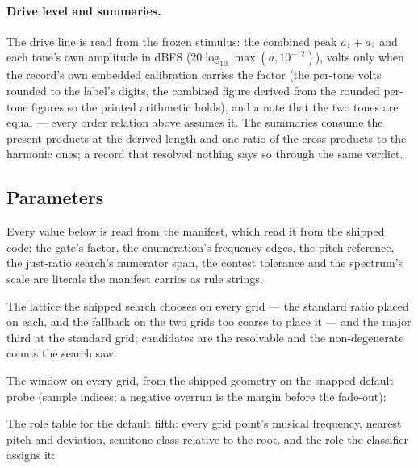 \documentclass[11pt,a4paper]{article}
\begin{document}
\paragraph{Drive level and summaries.}
The drive line is read from the frozen stimulus: the combined peak
$a_1 + a_2$ and each tone's own amplitude in dBFS
($20\log_{10}\max(a, 10^{-12})$), volts only when the record's own
embedded calibration carries the factor (the per-tone volts rounded to the
label's digits, the combined figure derived from the rounded per-tone
figures so the printed arithmetic holds), and a note that the two tones
are equal --- every order relation above assumes it. The summaries
consume the present products at the derived length and one ratio of the
cross products to the harmonic ones; a record that resolved nothing says
so through the same verdict.

\subsection{Parameters}
\label{sec:imd-parameters}
Every value below is read from the manifest, which read it from the
shipped code; the gate's factor, the enumeration's frequency edges, the
pitch reference, the just-ratio search's numerator span, the contest
tolerance and the spectrum's scale are literals the manifest carries as
rule strings.



The lattice the shipped search chooses on every grid --- the standard
ratio placed on each, and the fallback on the two grids too coarse to
place it --- and the major third at the standard grid; candidates are the
resolvable and the non-degenerate counts the search saw:

\begin{center}\scriptsize\setlength{\tabcolsep}{2.5pt}\imdSnapTable\end{center}

The window on every grid, from the shipped geometry on the snapped default
probe (sample indices; a negative overrun is the margin before the
fade-out):

\begin{center}\scriptsize\setlength{\tabcolsep}{4pt}\imdWindowTable\end{center}

The role table for the default fifth: every grid point's musical
frequency, nearest pitch and deviation, semitone class relative to the
root, and the role the classifier assigns it:
\end{document}
